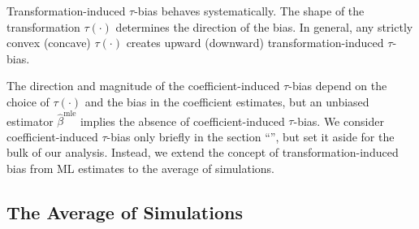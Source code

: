 \documentclass[11pt]{article}
\begin{document}
Transformation-induced $\tau$-bias behaves systematically. The shape of the transformation $\tau(\cdot)$ determines the direction of the bias. In general, any strictly convex (concave) $\tau(\cdot)$ creates upward (downward) transformation-induced $\tau$-bias.

The direction and magnitude of the coefficient-induced $\tau$-bias depend on the choice of $\tau(\cdot)$ and the bias in the coefficient estimates, but an unbiased estimator $\hat{\beta}^\text{mle}$ implies the absence of coefficient-induced $\tau$-bias. We consider coefficient-induced $\tau$-bias only briefly in the section ``'', but set it aside for the bulk of our analysis. Instead, we extend the concept of transformation-induced bias from ML estimates to the average of simulations. 

\subsection*{The Average of Simulations}
\end{document}
